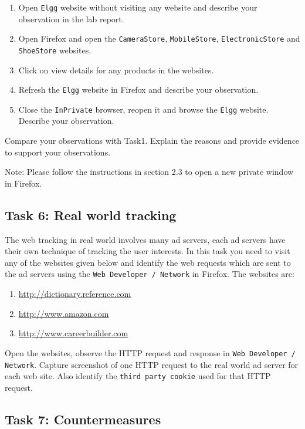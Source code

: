 \begin{enumerate}
  \item Open {\tt Elgg} website without visiting any website and describe your observation in the lab report.
  \item Open Firefox and open the {\tt CameraStore}, {\tt MobileStore}, {\tt ElectronicStore} and {\tt ShoeStore} websites.
  \item Click on view details for any products in the websites.
  \item Refresh the {\tt Elgg} website in Firefox and describe your observation.
  \item Close the {\tt InPrivate} browser, reopen it and browse the {\tt Elgg} website. Describe your observation.
\end{enumerate}

Compare your observations with Task1. Explain the reasons and provide evidence to support your observations.

Note: Please follow the instructions in section 2.3 to open a new private window in Firefox.

\subsection{Task 6: Real world tracking}

The web tracking in real world involves many ad servers, each ad servers have their own technique of tracking the user interests. 
In this task you need to visit any of the websites given below and identify the web requests which are sent to the ad servers using the {\tt Web Developer / Network} in Firefox.
The websites are:

\begin{enumerate}
  \item \url{http://dictionary.reference.com}
  \item \url{http://www.amazon.com}
  \item \url{http://www.careerbuilder.com}
\end{enumerate}

Open the websites, observe the HTTP request and response in {\tt Web Developer / Network}. 
Capture screenshot of one HTTP request to the real world ad server for each web site. 
Also identify the {\tt third party cookie} used for that HTTP request.

\subsection{Task 7: Countermeasures}

